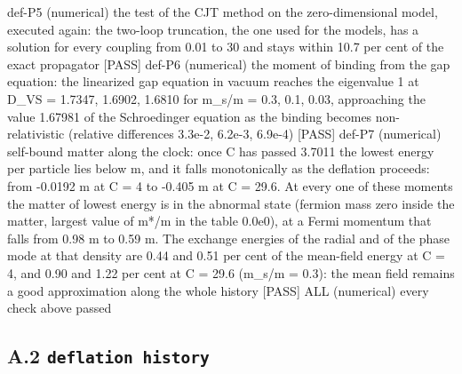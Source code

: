 \documentclass[
  10pt,
]{article}
\newenvironment{Shaded}{}{}
\newcommand{\NormalTok}[1]{#1}
\begin{document}
\begin{Shaded}
\begin{Highlighting}[]
\NormalTok{[PASS] def{-}P5  (numerical) the test of the CJT method on the zero{-}dimensional model, executed again: the two{-}loop truncation, the one used for the models, has a solution for every coupling from 0.01 to 30 and stays within 10.7 per cent of the exact propagator}
\NormalTok{[PASS] def{-}P6  (numerical) the moment of binding from the gap equation: the linearized gap equation in vacuum reaches the eigenvalue 1 at D\_VS = 1.7347, 1.6902, 1.6810 for m\_s/m = 0.3, 0.1, 0.03, approaching the value 1.67981 of the Schroedinger equation as the binding becomes non{-}relativistic (relative differences 3.3e{-}2, 6.2e{-}3, 6.9e{-}4)}
\NormalTok{[PASS] def{-}P7  (numerical) self{-}bound matter along the clock: once C has passed 3.7011 the lowest energy per particle lies below m, and it falls monotonically as the deflation proceeds: from {-}0.0192 m at C = 4 to {-}0.405 m at C = 29.6. At every one of these moments the matter of lowest energy is in the abnormal state (fermion mass zero inside the matter, largest value of m*/m in the table 0.0e0), at a Fermi momentum that falls from 0.98 m to 0.59 m. The exchange energies of the radial and of the phase mode at that density are 0.44 and 0.51 per cent of the mean{-}field energy at C = 4, and 0.90 and 1.22 per cent at C = 29.6 (m\_s/m = 0.3): the mean field remains a good approximation along the whole history}
\NormalTok{[PASS] ALL  (numerical) every check above passed}
\end{Highlighting}
\end{Shaded}

\hypertarget{a.2-deflation-history}{%
\subsection{\texorpdfstring{A.2
\texttt{deflation\ history}}{A.2 deflation history}}\label{a.2-deflation-history}}
\end{document}
